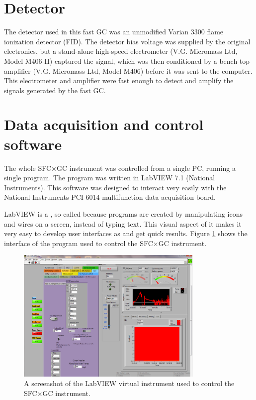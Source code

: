 \section{Detector}

The detector used in this fast GC was an unmodified Varian\texttrademark{} 3300
flame ionization detector (FID). The detector bias voltage was supplied by the
original electronics, but a stand-alone high-speed electrometer (V.G. Micromass
Ltd, Model M406-H) captured the signal, which was then conditioned by a
bench-top amplifier (V.G. Micromass Ltd, Model M406) before it was sent to the
computer. This electrometer and amplifier were fast enough to detect and amplify
the signals generated by the fast GC.

\section{Data acquisition and control software}

The whole SFC×GC instrument was controlled from a single PC, running a single
program. The program was written in LabVIEW 7.1\texttrademark{} (National
Instruments). This software was designed to interact very easily with the
National Instruments PCI-6014 multifunction data acquisition board.

LabVIEW is a , so called because programs
are created by manipulating icons and wires on a screen, instead of typing text.
This visual aspect of it makes it very easy to develop user interfaces as
 and get quick results. Figure \ref{fig:SFCGCFastVI}
shows the interface of the program used to control the SFC×GC instrument.

\begin{figure}
	\centering
	\includegraphics[width=0.8\textwidth]{Figures/Screenshot.png}
	\decoRule
	
	\caption[The main LabVIEW VI]{A screenshot of the LabVIEW virtual instrument
	used to control the SFC×GC instrument.}
	
	\label{fig:SFCGCFastVI}
\end{figure}


